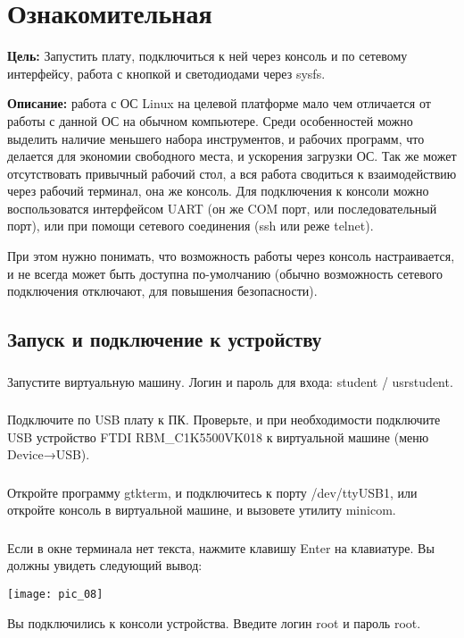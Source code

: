\chapter{Ознакомительная}
\textbf{Цель:} Запустить плату, подключиться к ней через консоль и по сетевому интерфейсу, работа с кнопкой и светодиодами через sysfs.

\vspace{5mm}
\textbf{Описание:} работа с ОС Linux на целевой платформе мало чем отличается от работы с данной ОС на обычном компьютере. Среди особенностей можно выделить наличие меньшего набора инструментов, и рабочих программ, что делается для экономии свободного места, и ускорения загрузки ОС. Так же может отсутствовать привычный рабочий стол, а вся работа сводиться к взаимодействию через рабочий терминал, она же консоль. Для подключения к консоли можно воспользоватся интерфейсом UART (он же COM порт, или последовательный порт), или при помощи сетевого соединения (ssh или реже telnet). 

При этом нужно понимать, что возможность работы через консоль настраивается, и не всегда может быть доступна по-умолчанию (обычно возможность сетевого подключения отключают, для повышения безопасности). 

\section{Запуск и подключение к устройству}

\subsection{}Запустите виртуальную машину. Логин и пароль для входа: student / usrstudent.

\subsection{}Подключите по USB плату к ПК. Проверьте, и при необходимости подключите USB устройство FTDI RBM\_C1K5500VK018 к виртуальной машине (меню Device→USB).

\subsection{}Откройте программу gtkterm, и подключитесь к порту /dev/ttyUSB1, или откройте консоль в виртуальной машине, и вызовете утилиту minicom.

\subsection{}Если в окне терминала нет текста, нажмите клавишу Enter на клавиатуре. Вы должны увидеть следующий вывод:
\begin{center}
	\texttt{[image: pic\_08]}
\end{center}
Вы подключились к консоли устройства. Введите логин root и пароль root.

